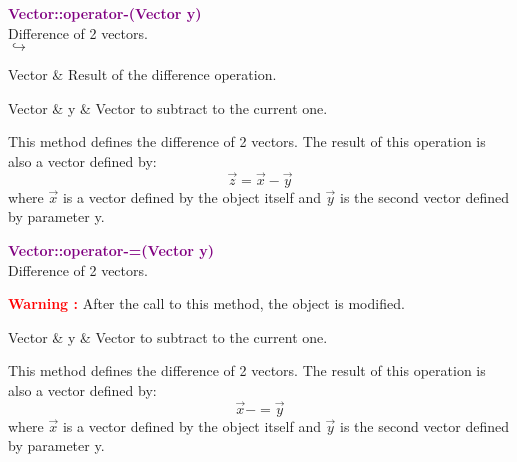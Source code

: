 \textcolor{purple}{\textbf{Vector::operator-(Vector y)}}\label{Vector::operator-(Vector y)}\\
Difference of 2 vectors.\\ \hspace*{5mm}$\hookrightarrow$
\vspace*{-2em}\begin{tcolorbox}[grow to left by=-1cm, width=\textwidth-1cm,myArgs,tabularx={l|R}]
Vector & Result of the difference operation.
\end{tcolorbox}

\begin{tcolorbox}[width=\textwidth,myArgs,tabularx={ll|R}]
Vector & y & Vector to subtract to the current one.
\end{tcolorbox}

This method defines the difference of 2 vectors.
The result of this operation is also a vector defined by:
\begin{equation*}
\overrightarrow{z}=\overrightarrow{x}-\overrightarrow{y}
\end{equation*}
where $\overrightarrow{x}$ is a vector defined by the object itself and $\overrightarrow{y}$ is the second vector defined by parameter y.

\textcolor{purple}{\textbf{Vector::operator-=(Vector y)}}\label{Vector::operator-=(Vector y)}\\
Difference of 2 vectors.

\hspace*{10mm}\textcolor{red}{\textbf{Warning :}} After the call to this method, the object is modified.

\begin{tcolorbox}[width=\textwidth,myArgs,tabularx={ll|R}]
Vector & y & Vector to subtract to the current one.
\end{tcolorbox}

This method defines the difference of 2 vectors.
The result of this operation is also a vector defined by:
\begin{equation*}
\overrightarrow{x}-=\overrightarrow{y}
\end{equation*}
where $\overrightarrow{x}$ is a vector defined by the object itself and $\overrightarrow{y}$ is the second vector defined by parameter y.


